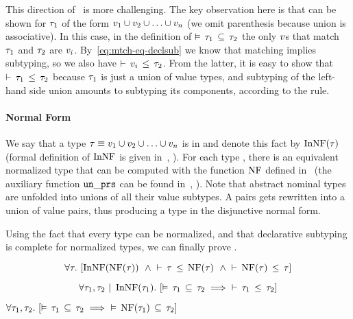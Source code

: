 This direction of~ is more challenging. 
The key observation here is that  can be shown for 
$\tau_1$ of the form $v_1 \cup v_2 \cup \ldots \cup v_n$
(we omit parenthesis because union is associative).
In this case, in the definition of $\vDash \, \tau_1 \, \subseteq \, \tau_2$ the only
$v$s that match $\tau_1$ and $\tau_2$ are $v_i$. 
By~\eqref{eq:mtch-eq-declsub} we know that matching implies subtyping,
so we also have $\vdash \, v_i \, \leq \, \tau_2$.
From the latter, it is easy to show that $\vdash \, \tau_1 \, \leq \, \tau_2$ because
$\tau_1$ is just a union of value types, 
and subtyping of the left-hand side union amounts to subtyping its components,
according to the  rule.

\paragraph{Normal Form}
We say that a type $\tau \equiv v_1 \cup v_2 \cup \ldots \cup v_n$
is in  and denote this fact by $\mathop{\mathrm{InNF}}(\tau)$ 
(formal definition of $\mathop{\mathrm{InNF}}$ is given 
in~, ).
For each type \ty, there is an equivalent normalized type 
that can be computed with the function $\mathop{\mathrm{NF}}$
defined in~ (the auxiliary function $\mathop{\mathtt{un\_prs}}$ 
can be found in~, ).
Note that abstract nominal types are unfolded into unions of all their
value subtypes. A pairs gets rewritten into a union of value pairs, 
thus producing a type in the disjunctive normal form.

Using the fact that every type can be normalized,
and that declarative subtyping is complete for normalized types, 
we can finally prove .

\begin{lemma}\label{lem:declsub-nf}
\[
\forall \tau.\ [\mathop{\mathrm{InNF}}(\mathop{\mathrm{NF}}(\tau))\;\ \land\;
\vdash \, \tau \, \leq \, \mathop{\mathrm{NF}}(\tau)\;\ \land\; \vdash \, \mathop{\mathrm{NF}}(\tau) \, \leq \, \tau]
\]
\end{lemma}

\begin{lemma}
\label{lem:nf-declsub-complete}
\[
	\forall \ty_1, \ty_2 \Alt \InNF(\ty_1).\
	[\bjsemsub{\ty_1}{\ty_2} \implies\ \bjsub{\ty_1}{\ty_2}]
\]
\end{lemma}

\begin{lemma}\label{lem:nf-semsub}
$
\forall \ty_1, \ty_2.\ 
[\bjsemsub{\ty_1}{\ty_2} \implies\ \bjsemsub{\NF(\ty_1)}{\ty_2}]
$
\end{lemma}

